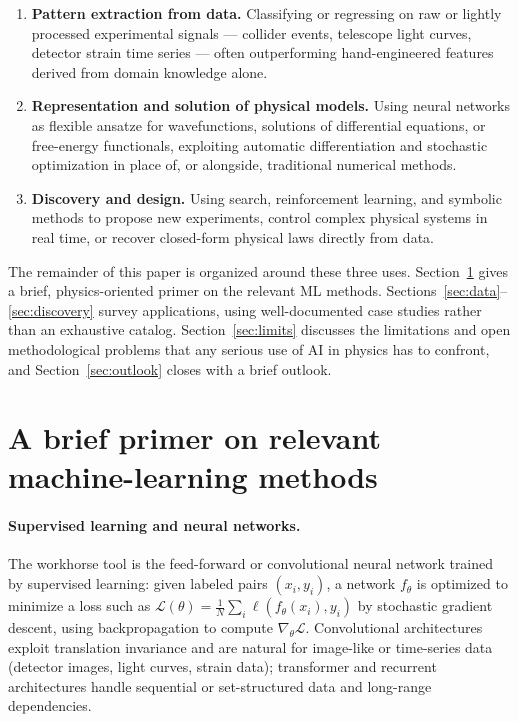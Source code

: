 \documentclass[11pt]{article}
\begin{document}
\begin{enumerate}[label=(\roman*)]
    \item \textbf{Pattern extraction from data.} Classifying or regressing on raw or lightly processed experimental signals --- collider events, telescope light curves, detector strain time series --- often outperforming hand-engineered features derived from domain knowledge alone.
    \item \textbf{Representation and solution of physical models.} Using neural networks as flexible ansatze for wavefunctions, solutions of differential equations, or free-energy functionals, exploiting automatic differentiation and stochastic optimization in place of, or alongside, traditional numerical methods.
    \item \textbf{Discovery and design.} Using search, reinforcement learning, and symbolic methods to propose new experiments, control complex physical systems in real time, or recover closed-form physical laws directly from data.
\end{enumerate}

The remainder of this paper is organized around these three uses. Section~\ref{sec:primer} gives a brief, physics-oriented primer on the relevant ML methods. Sections~\ref{sec:data}--\ref{sec:discovery} survey applications, using well-documented case studies rather than an exhaustive catalog. Section~\ref{sec:limits} discusses the limitations and open methodological problems that any serious use of AI in physics has to confront, and Section~\ref{sec:outlook} closes with a brief outlook.

\section{A brief primer on relevant machine-learning methods}
\label{sec:primer}

\paragraph{Supervised learning and neural networks.} The workhorse tool is the feed-forward or convolutional neural network trained by supervised learning: given labeled pairs $(x_i, y_i)$, a network $f_\theta$ is optimized to minimize a loss such as $\mathcal{L}(\theta) = \frac{1}{N}\sum_i \ell(f_\theta(x_i), y_i)$ by stochastic gradient descent, using backpropagation to compute $\nabla_\theta \mathcal{L}$. Convolutional architectures exploit translation invariance and are natural for image-like or time-series data (detector images, light curves, strain data); transformer and recurrent architectures handle sequential or set-structured data and long-range dependencies.
\end{document}
